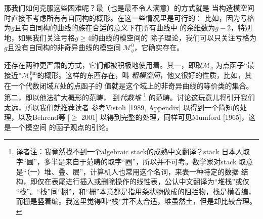 那我们如何克服这些困难呢？最\naive（也是最不令人满意）的方式就是
当构造模空间时直接不考虑所有有自同构的概形。在这一些情况里是可行的：
比如，因为亏格为$g$且有自同构的曲线的族在合适的意义下在所有曲线中
的余维数为$g-2$，特别地，如果我们关注亏格$g\geq 4$的曲线的模空间的
除子理论，我们可以只关注亏格为$g$且没有自同构的非奇异曲线的模空间
$\mathscr M_g^0$，它确实存在。

还存在两种更严肃的方式，它们都被积极地使用着。其一，即取$\mathscr M_g$
为点函子“最接近”$\mathscr M_g^{\text{fun}}$的概形。这样的东西存在，叫
\emph{粗模空间}，他又很好的性质，比如，其在一个代数闭域$K$处的点函子的
值就是这个域上的非奇异曲线的等价类的集合。第二，即以他法扩大概形的范畴，
到\emph{代数堆}%
\footnote{译者注：我竟然找不到一个algebraic stack的成熟中文翻译？stack
日本人取字“園”，多半是来自于范畴的取字“圈”，所以并不可考。数学家对stack
取意是“（一）堆、叠、层”，计算机人也常用这个名词，来表一种特定的数据
结构，即仅在表尾进行插入或删除操作的线性表，公认中文翻译为“堆栈”或仅
“栈”。“栈”同“棚”，和“栅”本意都是指用条状物做成的阻拦物，栈是横着编，
而栅是竖着编。我这里觉得叫“栈”并不太合适，堆虽然土，但是却比较合理。
}%
的范畴。讨论这玩意儿将引开我们太远，所以我们就推荐读者%
参考Vistoli [1989, Appendix] 以得到一个简短的处理，以及Behrend等
[$\geq$ 2001] 以得到完整的处理，同样可见Mumford [1965]，这是一个模空间
的函子观点的引论。